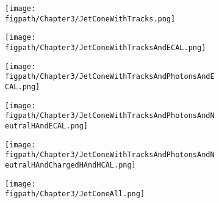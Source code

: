 \begin{figure}[!hbt]
    \centering
    \begin{subfigure}[t]{0.32\textwidth}
        \texttt{[image: \\figpath/Chapter3/JetConeWithTracks.png]}
        \caption{}
        \label{fig:jc_track}
    \end{subfigure}
    \begin{subfigure}[t]{0.32\textwidth}
        \texttt{[image: \\figpath/Chapter3/JetConeWithTracksAndECAL.png]}
        \caption{}
        \label{fig:jc_track_ecal}
    \end{subfigure}
    \begin{subfigure}[t]{0.32\textwidth}
        \texttt{[image: \\figpath/Chapter3/JetConeWithTracksAndPhotonsAndECAL.png]}
        \caption{}
        \label{fig:jc_track_photon_ecal}
    \end{subfigure}

    \begin{subfigure}[t]{0.32\textwidth}
        \texttt{[image: \\figpath/Chapter3/JetConeWithTracksAndPhotonsAndNeutralHAndECAL.png]}
        \caption{}
        \label{fig:jc_track_photon_neutralH_ecal}
    \end{subfigure}
    \begin{subfigure}[t]{0.32\textwidth}
        \texttt{[image: \\figpath/Chapter3/JetConeWithTracksAndPhotonsAndNeutralHAndChargedHAndHCAL.png]}
        \caption{}
        \label{fig:jc_track_photon_neutralH_chargedH_hcal}
    \end{subfigure}
    \begin{subfigure}[t]{0.32\textwidth}
        \texttt{[image: \\figpath/Chapter3/JetConeAll.png]}
        \caption{}
        \label{fig:jc_all}
    \end{subfigure}


\end{figure}
